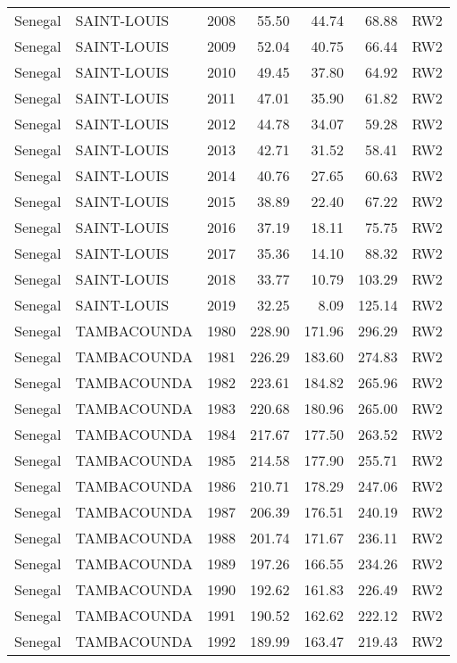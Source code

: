 \begin{longtable}{lllrrrl}
  Senegal & SAINT-LOUIS & 2008 & 55.50 & 44.74 & 68.88 & RW2 \\ 
  Senegal & SAINT-LOUIS & 2009 & 52.04 & 40.75 & 66.44 & RW2 \\ 
  Senegal & SAINT-LOUIS & 2010 & 49.45 & 37.80 & 64.92 & RW2 \\ 
  Senegal & SAINT-LOUIS & 2011 & 47.01 & 35.90 & 61.82 & RW2 \\ 
  Senegal & SAINT-LOUIS & 2012 & 44.78 & 34.07 & 59.28 & RW2 \\ 
  Senegal & SAINT-LOUIS & 2013 & 42.71 & 31.52 & 58.41 & RW2 \\ 
  Senegal & SAINT-LOUIS & 2014 & 40.76 & 27.65 & 60.63 & RW2 \\ 
  Senegal & SAINT-LOUIS & 2015 & 38.89 & 22.40 & 67.22 & RW2 \\ 
  Senegal & SAINT-LOUIS & 2016 & 37.19 & 18.11 & 75.75 & RW2 \\ 
  Senegal & SAINT-LOUIS & 2017 & 35.36 & 14.10 & 88.32 & RW2 \\ 
  Senegal & SAINT-LOUIS & 2018 & 33.77 & 10.79 & 103.29 & RW2 \\ 
  Senegal & SAINT-LOUIS & 2019 & 32.25 & 8.09 & 125.14 & RW2 \\ 
  Senegal & TAMBACOUNDA & 1980 & 228.90 & 171.96 & 296.29 & RW2 \\ 
  Senegal & TAMBACOUNDA & 1981 & 226.29 & 183.60 & 274.83 & RW2 \\ 
  Senegal & TAMBACOUNDA & 1982 & 223.61 & 184.82 & 265.96 & RW2 \\ 
  Senegal & TAMBACOUNDA & 1983 & 220.68 & 180.96 & 265.00 & RW2 \\ 
  Senegal & TAMBACOUNDA & 1984 & 217.67 & 177.50 & 263.52 & RW2 \\ 
  Senegal & TAMBACOUNDA & 1985 & 214.58 & 177.90 & 255.71 & RW2 \\ 
  Senegal & TAMBACOUNDA & 1986 & 210.71 & 178.29 & 247.06 & RW2 \\ 
  Senegal & TAMBACOUNDA & 1987 & 206.39 & 176.51 & 240.19 & RW2 \\ 
  Senegal & TAMBACOUNDA & 1988 & 201.74 & 171.67 & 236.11 & RW2 \\ 
  Senegal & TAMBACOUNDA & 1989 & 197.26 & 166.55 & 234.26 & RW2 \\ 
  Senegal & TAMBACOUNDA & 1990 & 192.62 & 161.83 & 226.49 & RW2 \\ 
  Senegal & TAMBACOUNDA & 1991 & 190.52 & 162.62 & 222.12 & RW2 \\ 
  Senegal & TAMBACOUNDA & 1992 & 189.99 & 163.47 & 219.43 & RW2 \\ 

\end{longtable}
